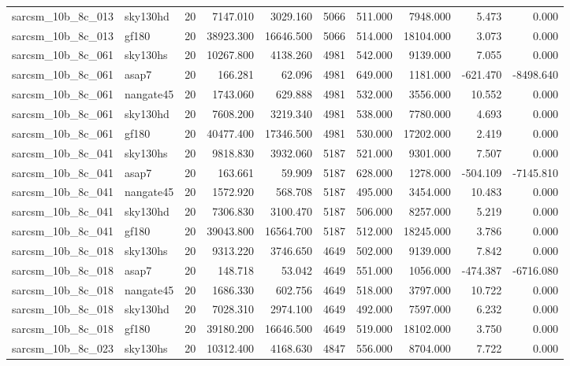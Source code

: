 \begin{tabular}{llrrrrrrrr}
sarcsm\_10b\_8c\_013 & sky130hd & 20 & 7147.010 & 3029.160 & 5066 & 511.000 & 7948.000 & 5.473 & 0.000 \\
sarcsm\_10b\_8c\_013 & gf180 & 20 & 38923.300 & 16646.500 & 5066 & 514.000 & 18104.000 & 3.073 & 0.000 \\
sarcsm\_10b\_8c\_061 & sky130hs & 20 & 10267.800 & 4138.260 & 4981 & 542.000 & 9139.000 & 7.055 & 0.000 \\
sarcsm\_10b\_8c\_061 & asap7 & 20 & 166.281 & 62.096 & 4981 & 649.000 & 1181.000 & -621.470 & -8498.640 \\
sarcsm\_10b\_8c\_061 & nangate45 & 20 & 1743.060 & 629.888 & 4981 & 532.000 & 3556.000 & 10.552 & 0.000 \\
sarcsm\_10b\_8c\_061 & sky130hd & 20 & 7608.200 & 3219.340 & 4981 & 538.000 & 7780.000 & 4.693 & 0.000 \\
sarcsm\_10b\_8c\_061 & gf180 & 20 & 40477.400 & 17346.500 & 4981 & 530.000 & 17202.000 & 2.419 & 0.000 \\
sarcsm\_10b\_8c\_041 & sky130hs & 20 & 9818.830 & 3932.060 & 5187 & 521.000 & 9301.000 & 7.507 & 0.000 \\
sarcsm\_10b\_8c\_041 & asap7 & 20 & 163.661 & 59.909 & 5187 & 628.000 & 1278.000 & -504.109 & -7145.810 \\
sarcsm\_10b\_8c\_041 & nangate45 & 20 & 1572.920 & 568.708 & 5187 & 495.000 & 3454.000 & 10.483 & 0.000 \\
sarcsm\_10b\_8c\_041 & sky130hd & 20 & 7306.830 & 3100.470 & 5187 & 506.000 & 8257.000 & 5.219 & 0.000 \\
sarcsm\_10b\_8c\_041 & gf180 & 20 & 39043.800 & 16564.700 & 5187 & 512.000 & 18245.000 & 3.786 & 0.000 \\
sarcsm\_10b\_8c\_018 & sky130hs & 20 & 9313.220 & 3746.650 & 4649 & 502.000 & 9139.000 & 7.842 & 0.000 \\
sarcsm\_10b\_8c\_018 & asap7 & 20 & 148.718 & 53.042 & 4649 & 551.000 & 1056.000 & -474.387 & -6716.080 \\
sarcsm\_10b\_8c\_018 & nangate45 & 20 & 1686.330 & 602.756 & 4649 & 518.000 & 3797.000 & 10.722 & 0.000 \\
sarcsm\_10b\_8c\_018 & sky130hd & 20 & 7028.310 & 2974.100 & 4649 & 492.000 & 7597.000 & 6.232 & 0.000 \\
sarcsm\_10b\_8c\_018 & gf180 & 20 & 39180.200 & 16646.500 & 4649 & 519.000 & 18102.000 & 3.750 & 0.000 \\
sarcsm\_10b\_8c\_023 & sky130hs & 20 & 10312.400 & 4168.630 & 4847 & 556.000 & 8704.000 & 7.722 & 0.000 \\

\end{tabular}
